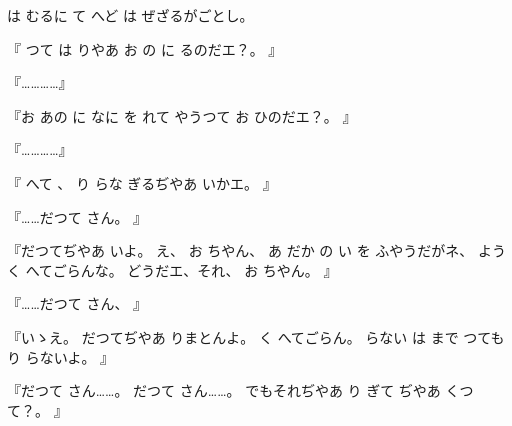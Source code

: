 は
むるに
て
へど
は
ぜざるがごとし。

『
つて
は
りやあ
お
の
に
るのだエ？。
』

『…………』

『お
あの
に
なに
を
れて
やうつて
お
ひのだエ？。
』

『…………』

『
へて
、
%
り
らな
ぎるぢやあ
いかエ。
』

『……だつて
さん。
』

『だつてぢやあ
いよ。
%
え、
%
お
ちやん、
%
あ
だか
の
い
を
ふやうだがネ、
%
ようく
へてごらんな。
%
どうだエ、それ、
%
お
ちやん。
』

『……だつて
さん、
』

『いゝえ。
%
だつてぢやあ
りまとんよ。
%
く
へてごらん。
%
らない
は
まで
つても
り
らないよ。
』

『だつて
さん……。
%
だつて
さん……。
%
でもそれぢやあ
り
ぎて
ぢやあ
くつて？。
』
